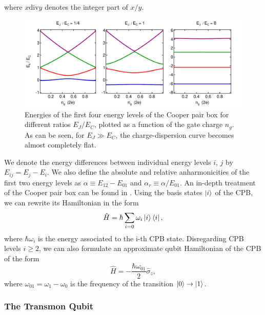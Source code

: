 %
where $x\mathrm{div}y$ denotes the integer part of $x/y$.
\begin{figure}[ht!]
	\includegraphics[width=\textwidth]{"./material/mathematica/cooper_pair_box_energies"}
	\caption{Energies of the first four energy levels of the Cooper pair box for different ratios $E_J/E_C$, plotted as a function of the gate charge $n_g$. As can be seen, for $E_J \gg E_C$, the charge-dispersion curve becomes almost completely flat.}
	\label{fig:CooperPairBoxEnergies}
\end{figure}

We denote the energy differences between individual energy levels $i$, $j$ by $E_{ij} = E_j - E_i$. We also define the absolute and relative anharmonicities of the first two energy levels as $\alpha \equiv E_{12}-E_{01}$ and $\alpha_r \equiv \alpha / E_{01}$. An in-depth treatment of the Cooper pair box can be found in \citep{cottet_implementation_2002}. Using the basis states $\left| i \right>$ of the CPB, we can rewrite its Hamiltonian in the form 
%
\begin{equation}
\hat{H} = \hbar\sum\limits_{i=0} \omega_i\left| i \right>\left< i \right|,
\end{equation}
%
where $\hbar\omega_i$ is the energy associated to the i-th CPB state. Disregarding CPB levels $i \ge 2$, we can also formulate an approximate qubit Hamiltonian of the CPB of the form
%
\begin{equation}
\hat{H} = -\frac{\hbar\omega_{01}}{2}\hat{\sigma}_z, \label{eq:cpb_qubit_hamiltonian}
\end{equation}
%
where $\omega_{01}=\omega_1-\omega_0$ is the frequency of the transition $\left| 0 \right>\to\left| 1 \right>$.

\subsubsection{The Transmon Qubit} \label{section:transmon_qubit}

